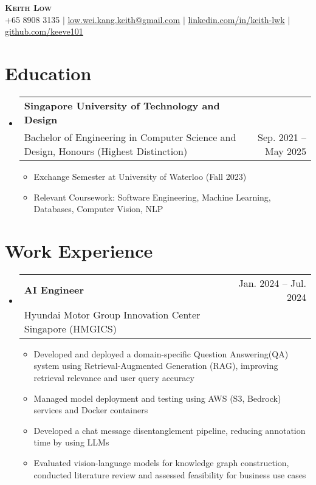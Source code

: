 \documentclass[letterpaper,11pt]{article}
\makeatletter
\newcommand{\resumeItem}[1]{
  \item\small{
    {#1 \vspace{-2pt}}
  }
}
\newcommand{\resumeSubheading}[4]{
  \vspace{-2pt}\item
    \begin{tabular*}{0.97\textwidth}[t]{l@{\extracolsep{\fill}}r}
      \textbf{#1} & #2 \\
      \textnormal{\small#3} & \textnormal{\small #4} \\
    \end{tabular*}\vspace{-7pt}
}
\newcommand{\resumeSubHeadingListStart}{\begin{itemize}[leftmargin=0.15in, label={}]}
\newcommand{\resumeSubHeadingListEnd}{\end{itemize}}
\newcommand{\resumeItemListStart}{\begin{itemize}}
\newcommand{\resumeItemListEnd}{\end{itemize}\vspace{-5pt}}
\makeatother
\begin{document}

\begin{center}
    \textbf{\Huge \scshape Keith Low} \\ \vspace{1pt}
    \small +65 8908 3135 $|$ \href{mailto:low.wei.kang.keith@gmail.com}{\underline{low.wei.kang.keith@gmail.com}} $|$ 
    \href{https://linkedin.com/in/keith-lwk}{\underline{linkedin.com/in/keith-lwk}} $|$
    \href{https://github.com/keeve101}{\underline{github.com/keeve101}}
\end{center}

\section{Education}
  \resumeSubHeadingListStart
    \resumeSubheading
      {Singapore University of Technology and Design}{}
      {Bachelor of Engineering in Computer Science and Design, Honours (Highest Distinction)}{Sep. 2021 -- May 2025}
      \resumeItemListStart
        \resumeItem{Exchange Semester at University of Waterloo (Fall 2023)}
        \resumeItem{Relevant Coursework: Software Engineering, Machine Learning, Databases, Computer Vision, NLP}
      \resumeItemListEnd
  \resumeSubHeadingListEnd
%

\section{Work Experience}
  \resumeSubHeadingListStart
    \resumeSubheading
      {AI Engineer}{Jan. 2024  -- Jul. 2024}
      {Hyundai Motor Group Innovation Center Singapore (HMGICS)}{}
      \resumeItemListStart
        \resumeItem{Developed and deployed a domain-specific Question Answering(QA) system using Retrieval-Augmented Generation (RAG), improving retrieval relevance and user query accuracy}
        \resumeItem{Managed model deployment and testing using AWS (S3, Bedrock) services and Docker containers}
        \resumeItem{Developed a chat message disentanglement pipeline, reducing annotation time by using LLMs}
        \resumeItem{Evaluated vision-language models for knowledge graph construction, conducted literature review and assessed feasibility for business use cases}
      \resumeItemListEnd
  \resumeSubHeadingListEnd
\end{document}
